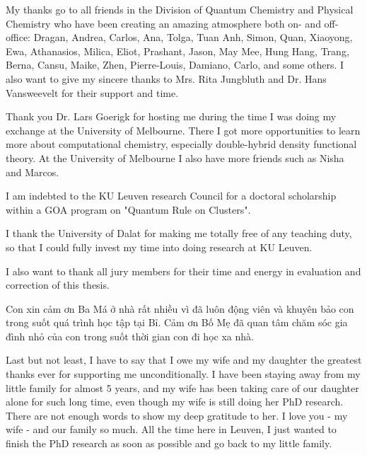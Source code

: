 My thanks go to all friends in the Division of Quantum Chemistry and Physical Chemistry who have been creating an amazing atmosphere both on- and off-office: Dragan, Andrea, Carlos, Ana, Tolga, Tuan Anh, Simon, Quan, Xiaoyong, Ewa, Athanasios, Milica, Eliot, Prashant, Jason, May Mee, Hung Hang, Trang, Berna, Cansu, Maike, Zhen, Pierre-Louis, Damiano, Carlo, and some others. I also want to give my sincere thanks to Mrs. Rita Jungbluth and Dr. Hans Vansweevelt for their support and time. 


Thank you Dr. Lars Goerigk for hosting me during the time I was doing my exchange at the University of Melbourne. There I got more opportunities to learn more about computational chemistry, especially double-hybrid density functional theory. At the University of Melbourne I also have more friends such as Nisha and Marcos.

I am indebted to the KU Leuven research Council for a doctoral scholarship within a GOA program on "Quantum Rule on Clusters".

I thank the University of Dalat for making me totally free of any teaching duty, so that I could fully invest my time into doing research at KU Leuven. 

I also want to thank all jury members for their time and energy in evaluation and correction of this thesis. 

\begin{otherlanguage}{vietnamese}
Con xin cảm ơn Ba Má ở nhà rất nhiều vì đã luôn động viên và khuyên bảo con trong suốt quá trình học tập tại Bỉ. Cảm ơn Bố Mẹ đã quan tâm chăm sóc gia đình nhỏ của con trong suốt thời gian con đi học xa nhà. 
\end{otherlanguage}




Last but not least, I have to say that I owe my wife and my daughter the greatest thanks ever for supporting me unconditionally. I have been staying away from my little family for almost 5 years, and my wife has been taking care of our daughter alone for such long time, even though my wife is still doing her PhD research. There are not enough words to show my deep gratitude to her. I love you - my wife - and our family so much. All the time here in Leuven, I just wanted to finish the PhD research as soon as possible and go back to my little family. 





\cleardoublepage

